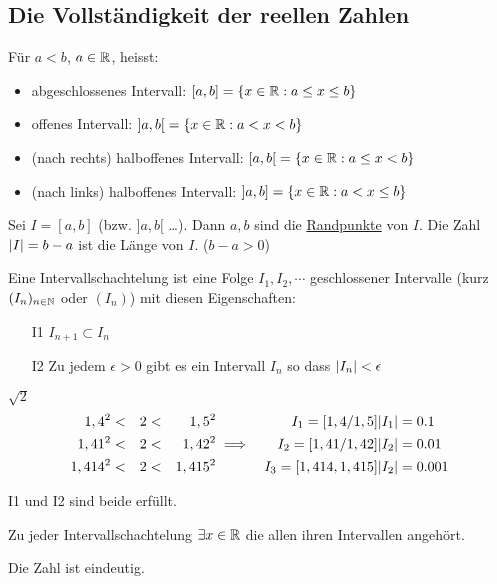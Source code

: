 \subsection{Die Vollständigkeit der reellen Zahlen}
Für $a<b$, $a\in\mathbb{R}$, heisst:
\begin{itemize}
  \item abgeschlossenes Intervall: $\left[ a,b \right]=\left\{ x\in\mathbb{R}: a\leq x\leq b \right\}$ 
  \item offenes Intervall: $\left] a,b \right[=\left\{ x\in\mathbb{R}: a< x< b \right\}$
  \item (nach rechts) halboffenes Intervall: $\left[ a,b \right[=\left\{ x\in\mathbb{R}: a\leq x< b \right\}$
  \item (nach links) halboffenes Intervall: $\left] a,b \right]=\left\{ x\in\mathbb{R}: a< x\leq b \right\}$
\end{itemize}
Sei $I=[a,b]$ (bzw. $]a,b[$ \ldots). Dann $a,b$ sind die \underline{Randpunkte} von $I$. Die Zahl $\mathopen| I \mathclose|=b-a$ ist die Länge von $I$. ($b-a>0$)
\begin{Def}
  Eine Intervallschachtelung ist eine Folge $I_1, I_2,\cdots$ geschlossener Intervalle (kurz $(I_n)_{n\in\mathbb{N}}$ oder $(I_n)$) mit diesen Eigenschaften:
  \begin{itemize}
    \item[I1] $I_{n+1}\subset I_n$
    \item[I2] Zu jedem $\epsilon >0$ gibt es ein Intervall $I_n$ so dass $\mathopen| I_n \mathclose| < \epsilon$
  \end{itemize}
\end{Def}
\begin{Bsp}
  $\sqrt{2}$
  \begin{align*}
    1,4^2 & < & 2 & < & 1,5^2 & & I_1 = \left[ 1,4 / 1,5 \right] & \mathopen| I_1 \mathclose| = 0.1\\
    1,41^2 & < & 2 & < & 1,42^2 & \implies & I_2 = \left[ 1,41 / 1,42 \right] & \mathopen| I_2 \mathclose| = 0.01\\
    1,414^2 & < & 2 & < & 1,415^2 & & I_3 = \left[ 1,414, 1,415 \right] & \mathopen| I_2 \mathclose| = 0.001 
  \end{align*}
\end{Bsp}
\begin{Bew}
  I1 und I2 sind beide erfüllt.
\end{Bew}
\begin{Axi}
  Zu jeder Intervallschachtelung $\exists x\in\mathbb{R}$ die allen ihren Intervallen angehört.
\end{Axi}
\begin{Sat}
  Die Zahl ist eindeutig.
\end{Sat}
